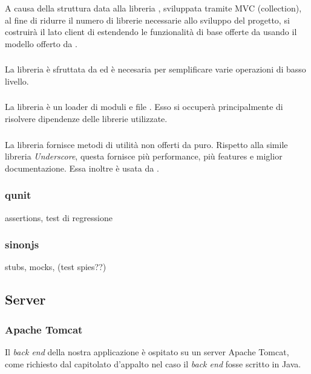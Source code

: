 A causa della struttura data alla libreria \jointjs{}, sviluppata tramite MVC (collection), al fine di ridurre il numero di librerie necessarie allo sviluppo del progetto, si costruirà il lato client di \proj{} estendendo le funzionalità di base offerte da \jointjs{} usando il modello \mvc{} offerto da \backbonejs{}.	

\subsubsection{\jquery}
La libreria \jquery{} è sfruttata da \jointjs{} ed è necesaria per semplificare varie operazioni di basso livello.

\subsubsection{\requirejs}
La libreria \requirejs{} è un loader di moduli e file \js{}. Esso si occuperà principalmente di risolvere dipendenze delle librerie \js{} utilizzate.

\subsubsection{\lodash}
La libreria \lodash{} fornisce metodi di utilità non offerti da \js{} puro. Rispetto alla simile libreria \emph{Underscore}, questa fornisce più performance, più features e miglior documentazione. Essa inoltre è usata da \jointjs{}.

\subsubsection{qunit}
assertions, test di regressione

\subsubsection{sinonjs}
stubs, mocks, (test spies??)



\subsection{Server}

\subsubsection{Apache Tomcat}
Il \emph{back end} della nostra applicazione è ospitato su un server Apache Tomcat, come richiesto dal capitolato d'appalto nel caso il \emph{back end} fosse scritto in Java.

